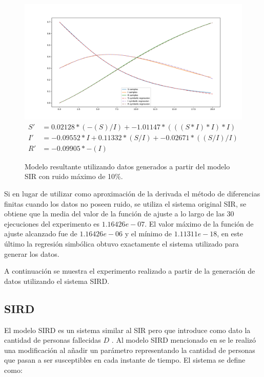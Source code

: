 \begin{figure}[h]
    \centering
    \includegraphics[width=\textwidth]{"figures/final_plot_SIR_0.1.pdf"}
    \begin{align*}
        S' & =  0.02128 * (-(S) / I) + -1.01147 * (((S * I) * I) * I)      \\
        I' & = -0.09552 * I + 0.11332 * (S / I) + -0.02671 * ((S / I) / I) \\
        R' & = -0.09905 * -(I)
    \end{align*}
    \caption{Modelo resultante utilizando datos generados a partir del modelo SIR con ruido máximo de 10\%.}
    \label{fig:final_plot_SIR_0.1}
\end{figure}

Si en lugar de utilizar como aproximación de la derivada el método de diferencias finitas cuando los datos no poseen ruido, se utiliza el sistema original SIR, se obtiene que la media del valor de la función de ajuste a lo largo de las 30 ejecuciones del experimento es $1.16426e-07$. El valor máximo de la función de ajuste alcanzado fue de $1.16426e-06$ y el mínimo de $1.11311e-18$, en este último la regresión simbólica obtuvo exactamente el sistema utilizado para generar los datos.

A continuación se muestra el experimento realizado a partir de la generación de datos utilizando el sistema SIRD.

\subsection{SIRD}

El modelo SIRD es un sistema similar al SIR pero que introduce como dato la cantidad de personas fallecidas $D$ \cite{bailey1975mathematical}. Al modelo SIRD mencionado en \cite{bailey1975mathematical} se le realizó una modificación al añadir un parámetro representando la cantidad de personas que pasan a ser susceptibles en cada instante de tiempo. El sistema se define como:

